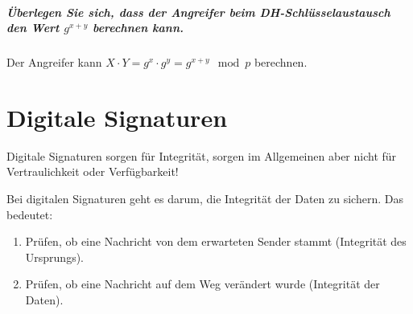 	\paragraph{Überlegen Sie sich, dass der Angreifer beim DH-Schlüsselaustausch den Wert \(g^{x + y}\) berechnen kann.}
		Der Angreifer kann \( X \cdot Y = g ^ x \cdot g ^ y = g ^ {x+y} \mod p \) berechnen.

\chapter{Digitale Signaturen}
Digitale Signaturen sorgen für Integrität, sorgen im Allgemeinen aber nicht für Vertraulichkeit oder Verfügbarkeit!

Bei digitalen Signaturen geht es darum, die Integrität der Daten zu sichern. Das bedeutet:
\begin{enumerate}
	\item Prüfen, ob eine Nachricht von dem erwarteten Sender stammt (Integrität des Ursprungs).
	\item Prüfen, ob eine Nachricht auf dem Weg verändert wurde (Integrität der Daten).
\end{enumerate}


